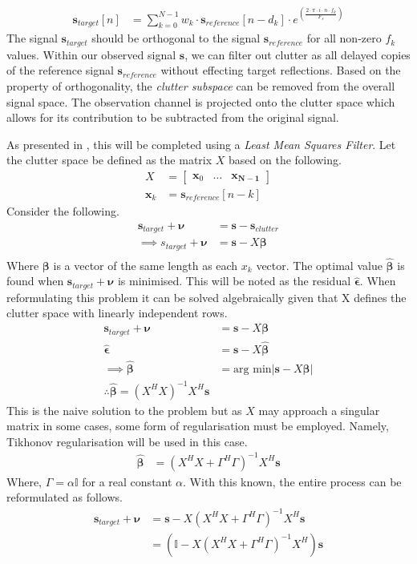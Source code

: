 \documentclass{article}
\begin{document}
\begin{align*}
  \bm{s}_{target}[n]&=\sum_{k=0}^{N-1}w_k\cdot \bm{s}_{reference}[n-d_k]\cdot e^{\left(\frac{2\cdot\pi\cdot i\cdot n\cdot f_k}{F_s}\right)}
\end{align*}
The signal $\bm{s}_{target}$ should be orthogonal to the signal $\bm{s}_{reference}$ for all non-zero $f_k$ values. Within our observed signal $\bm{s}$, we can filter out clutter as all delayed copies of the reference signal $\bm{s}_{reference}$ without effecting target reflections. Based on the property of orthogonality, the \textit{clutter subspace} can be removed from the overall signal space. The observation channel is projected onto the clutter space which allows for its contribution to be subtracted from the original signal.

As presented in \textcite{ManningClutter}, this will be completed using a \textit{Least Mean Squares Filter}. Let the clutter space be defined as the matrix $X$ based on the following.
\begin{align*}
  X&=\begin{bmatrix} \bm{x}_0 & \hdots & \bm{x_{N-1}} \end{bmatrix}\\ 
  \bm{x}_k&=\bm{s}_{reference}[n-k]
\end{align*}
Consider the following.
\begin{align*}
  \bm{s}_{target}+\bm{\nu} &= \bm{s}-\bm{s}_{clutter}\\
  \implies s_{target}+\bm{\nu} &= \bm{s} - X\bm{\beta}\\
\end{align*}
Where $\bm{\beta}$ is a vector of the same length as each $x_k$ vector. The optimal value $\hat{\bm{\beta}}$ is found when $\bm{s}_{target} + \bm{\nu}$ is minimised. This will be noted as the residual $\hat{\bm{\epsilon}}$. When reformulating this problem it can be solved algebraically given that X defines the clutter space with linearly independent rows.
\begin{align*}
  \bm{s}_{target}+\bm{\nu} &= \bm{s} - X\bm{\beta}\\
  \hat{\bm{\epsilon}} &= \bm{s} -X\hat{\bm{\beta}}\\
  \implies\hat{\bm{\beta}}&=\textrm{arg min}\left|\bm{s}-X\bm{\beta}\right|\\
  \therefore \hat{\bm{\beta}}=(X^HX)^{-1}X^H\bm{s} 
\end{align*}
This is the naive solution to the problem but as $X$ may approach a singular matrix in some cases, some form of regularisation must be employed. Namely, Tikhonov regularisation will be used in this case.
\begin{align*}
  \hat{\bm{\beta}}&=(X^HX+\Gamma^H\Gamma)^{-1}X^H\bm{s}
\end{align*}
Where, $\Gamma=\alpha \mathbb{I}$ for a real constant $\alpha$. With this known, the entire process can be reformulated as follows.
\begin{align*}
  \bm{s}_{target}+\bm{\nu}&=\bm{s}-X(X^HX+\Gamma^H\Gamma)^{-1}X^H\bm{s}\\
                          &=\left(\mathbb{I}-X(X^HX+\Gamma^H\Gamma)^{-1}X^H\right)\bm{s}
\end{align*}
\end{document}
